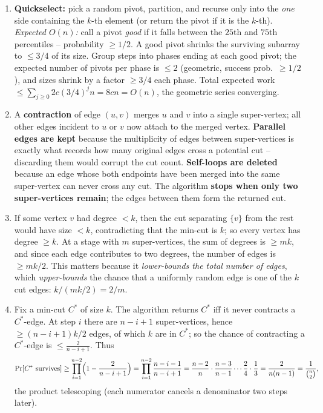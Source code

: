 \documentclass[11pt]{article}
\begin{document}
\begin{enumerate}[label=\textbf{A\arabic*.}, leftmargin=2.2em]
\item \textbf{Quickselect:} pick a random pivot, partition, and recurse only into the
\emph{one} side containing the $k$-th element (or return the pivot if it is the $k$-th).
\emph{Expected $O(n)$:} call a pivot \emph{good} if it falls between the $25$th and $75$th
percentiles -- probability $\ge 1/2$. A good pivot shrinks the surviving subarray to
$\le 3/4$ of its size. Group steps into phases ending at each good pivot; the expected
number of pivots per phase is $\le 2$ (geometric, success prob.\ $\ge 1/2$), and sizes
shrink by a factor $\ge 3/4$ each phase. Total expected work $\le \sum_{j\ge 0} 2c
(3/4)^j n = 8cn = O(n)$, the geometric series converging.

\item A \textbf{contraction} of edge $(u,v)$ merges $u$ and $v$ into a single
super-vertex; all other edges incident to $u$ or $v$ now attach to the merged vertex.
\textbf{Parallel edges are kept} because the multiplicity of edges between super-vertices
is exactly what records how many original edges cross a potential cut -- discarding them
would corrupt the cut count. \textbf{Self-loops are deleted} because an edge whose both
endpoints have been merged into the same super-vertex can never cross any cut. The
algorithm \textbf{stops when only two super-vertices remain}; the edges between them form
the returned cut.

\item If some vertex $v$ had degree $< k$, then the cut separating $\{v\}$ from the rest
would have size $< k$, contradicting that the min-cut is $k$; so every vertex has degree
$\ge k$. At a stage with $m$ super-vertices, the sum of degrees is $\ge mk$, and since each
edge contributes to two degrees, the number of edges is $\ge mk/2$. This matters because it
\emph{lower-bounds the total number of edges}, which \emph{upper-bounds} the chance that a
uniformly random edge is one of the $k$ cut edges: $k / (mk/2) = 2/m$.

\item Fix a min-cut $C^*$ of size $k$. The algorithm returns $C^*$ iff it never contracts a
$C^*$-edge. At step $i$ there are $n-i+1$ super-vertices, hence $\ge (n-i+1)k/2$ edges, of
which $k$ are in $C^*$; so the chance of contracting a $C^*$-edge is $\le \frac{2}{n-i+1}$.
Thus
\[
\Pr[C^* \text{ survives}] \ge \prod_{i=1}^{n-2}\Bigl(1 - \frac{2}{n-i+1}\Bigr)
= \prod_{i=1}^{n-2}\frac{n-i-1}{n-i+1}
= \frac{n-2}{n}\cdot\frac{n-3}{n-1}\cdots\frac{2}{4}\cdot\frac{1}{3} = \frac{2}{n(n-1)} = \frac{1}{\binom{n}{2}},
\]
the product telescoping (each numerator cancels a denominator two steps later).


\end{enumerate}
\end{document}
